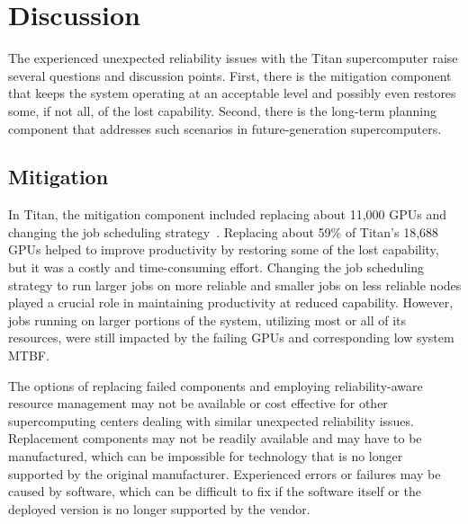 \section{Discussion}
\label{section:discussion}


The experienced unexpected reliability issues with the Titan supercomputer raise
several questions and discussion points. First, there is the mitigation component
that keeps the system operating at an acceptable level and possibly even restores
some, if not all, of the lost capability. Second, there is the long-term planning
component that addresses such scenarios in future-generation supercomputers.

\subsection{Mitigation}
\label{section:mitigation}

In Titan, the mitigation component included replacing about 11,000 GPUs and
changing the job scheduling strategy~\cite{8665764}. Replacing about 59\% of
Titan's 18,688 GPUs helped to improve productivity by restoring some of the lost
capability, but it was a costly and time-consuming effort. Changing the job
scheduling strategy to run larger jobs on more reliable and smaller jobs on less
reliable nodes played a crucial role in maintaining productivity at reduced
capability. However, jobs running on larger portions of the system, utilizing
most or all of its resources, were still impacted by the failing GPUs and
corresponding low system MTBF.

The options of replacing failed components and employing reliability-aware
resource management may not be available or cost effective for other
supercomputing centers dealing with similar unexpected reliability issues.
%
Replacement components may not be readily available and may have to be
manufactured, which can be impossible for technology that is no longer supported
by the original manufacturer. Experienced errors or failures may be caused by
software, which can be difficult to fix if the software itself or the deployed
version is no longer supported by the vendor.

